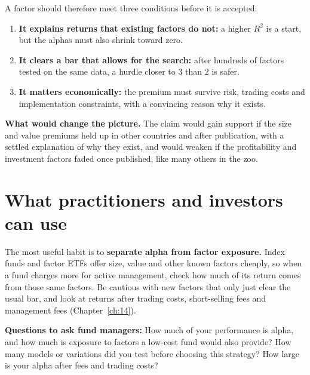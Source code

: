 A factor should therefore meet three conditions before it is accepted:

\begin{enumerate}
  \item \textbf{It explains returns that existing factors do not:} a higher $R^2$ is a start, but the alphas must also shrink toward zero.
  \item \textbf{It clears a bar that allows for the search:} after hundreds of factors tested on the same data, a hurdle closer to 3 than 2 is safer.
  \item \textbf{It matters economically:} the premium must survive risk, trading costs and implementation constraints, with a convincing reason why it exists.
\end{enumerate}

\textbf{What would change the picture.} The claim would gain support if the size and value premiums held up in other countries and after publication, with a settled explanation of why they exist, and would weaken if the profitability and investment factors faded once published, like many others in the zoo.

\section{What practitioners and investors can use}
\label{sec:04-investors}

The most useful habit is to \textbf{separate alpha from factor exposure.} Index funds and factor ETFs offer size, value and other known factors cheaply, so when a fund charges more for active management, check how much of its return comes from those same factors. Be cautious with new factors that only just clear the usual bar, and look at returns after trading costs, short-selling fees and management fees (Chapter~\ref{ch:14}).

\textbf{Questions to ask fund managers:} How much of your performance is alpha, and how much is exposure to factors a low-cost fund would also provide? How many models or variations did you test before choosing this strategy? How large is your alpha after fees and trading costs?

\makeatletter
{}
\makeatother

